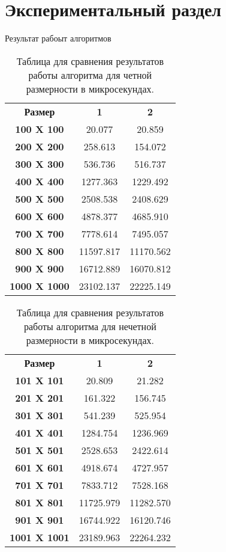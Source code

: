 \chapter{ Экспериментальный раздел}
Результат рабоыт алгоритмов

\begin{table}
	\label{tabular:even}
	\begin{center}
		\begin{tabular}{ccc}
			\textbf{Размер} & \textbf{1} & \textbf{2} \\
			\textbf{100 X 100} & 20.077 & 20.859 \\
			\textbf{200 X 200} & 258.613 & 154.072 \\
			\textbf{300 X 300} & 536.736 & 516.737 \\
			\textbf{400 X 400} & 1277.363 & 1229.492 \\
			\textbf{500 X 500} & 2508.538 & 2408.629 \\
			\textbf{600 X 600} & 4878.377 & 4685.910 \\
			\textbf{700 X 700} & 7778.614 & 7495.057 \\
			\textbf{800 X 800} & 11597.817 & 11170.562 \\
			\textbf{900 X 900} & 16712.889 & 16070.812 \\
			\textbf{1000 X 1000} & 23102.137 & 22225.149 \\
		\end{tabular}
	\end{center}
	\caption{Таблица для сравнения результатов работы алгоритма для четной размерности в микросекундах.}
\end{table}

\begin{table}
	\label{tabular:noneven}
	\begin{center}
		\begin{tabular}{ccc}
			\textbf{Размер} & \textbf{1} & \textbf{2} \\
			\textbf{101 X 101} & 20.809 & 21.282 \\
			\textbf{201 X 201} & 161.322 & 156.745 \\
			\textbf{301 X 301} & 541.239 & 525.954 \\
			\textbf{401 X 401} & 1284.754 & 1236.969 \\
			\textbf{501 X 501} & 2528.653 & 2422.614 \\
			\textbf{601 X 601} & 4918.674 & 4727.957 \\
			\textbf{701 X 701} & 7833.712 & 7528.168 \\
			\textbf{801 X 801} & 11725.979 & 11282.570 \\
			\textbf{901 X 901} & 16744.922 & 16120.746 \\
			\textbf{1001 X 1001} & 23189.963 & 22264.232 \\
		\end{tabular}
	\end{center}
	\caption{Таблица для сравнения результатов работы алгоритма для нечетной размерности в микросекундах.}
\end{table}


